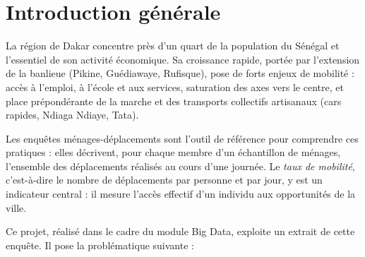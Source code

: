 \documentclass[12pt,a4paper]{report}
\newcommand{\1}{\mathbf{1}}
\begin{document}
\clearpage
\tableofcontents
\clearpage
\listoffigures
{}
\clearpage
\listoftables
{}
\clearpage
{}

\chapter*{Introduction générale}

La région de Dakar concentre près d'un quart de la population du Sénégal et l'essentiel de son activité économique. Sa croissance rapide, portée par l'extension de la banlieue (Pikine, Guédiawaye, Rufisque), pose de forts enjeux de mobilité : accès à l'emploi, à l'école et aux services, saturation des axes vers le centre, et place prépondérante de la marche et des transports collectifs artisanaux (cars rapides, Ndiaga Ndiaye, Tata).

Les enquêtes ménages-déplacements sont l'outil de référence pour comprendre ces pratiques : elles décrivent, pour chaque membre d'un échantillon de ménages, l'ensemble des déplacements réalisés au cours d'une journée. Le \emph{taux de mobilité}, c'est-à-dire le nombre de déplacements par personne et par jour, y est un indicateur central : il mesure l'accès effectif d'un individu aux opportunités de la ville.

Ce projet, réalisé dans le cadre du module Big Data, exploite un extrait de cette enquête. Il pose la problématique suivante :

\vspace{0.35cm}
\begin{center}
\end{center}
\vspace{0.35cm}
\end{document}
